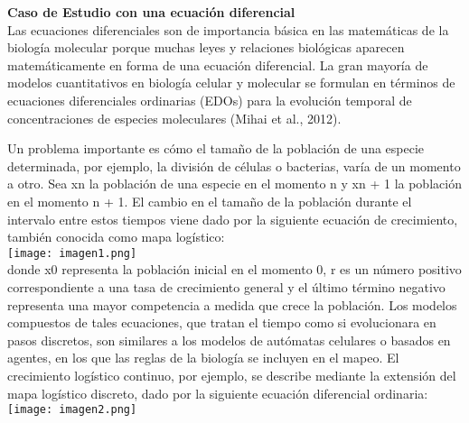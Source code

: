 \documentclass[12pt,a4paper]{article}
\begin{document}
    \textbf{Caso de Estudio con una ecuación diferencial}\\
    Las ecuaciones diferenciales son de importancia básica en las matemáticas de la biología molecular porque muchas leyes y relaciones biológicas aparecen matemáticamente en forma de una ecuación diferencial.  La gran mayoría de modelos cuantitativos en biología celular y molecular se formulan en términos de ecuaciones diferenciales ordinarias (EDOs) para la evolución temporal de concentraciones de especies moleculares (Mihai et al., 2012).  
    
    Un problema importante es cómo el tamaño de la población de una especie determinada, por ejemplo, la división de células o bacterias, varía de un momento a otro. Sea xn la población de una especie en el momento n y xn + 1 la población en el momento n + 1. El cambio en el tamaño de la población durante el intervalo entre estos tiempos viene dado por la siguiente ecuación de crecimiento, también conocida como mapa logístico:\\
    \texttt{[image: imagen1.png]}\\
    
    donde x0 representa la población inicial en el momento 0, r es un número positivo correspondiente a una tasa de crecimiento general y el último término negativo representa una mayor competencia a medida que crece la población.
     Los modelos compuestos de tales ecuaciones, que tratan el tiempo como si evolucionara en pasos discretos, son similares a los modelos de autómatas celulares o basados en agentes, en los que las reglas de la biología se incluyen en el mapeo. El crecimiento logístico continuo, por ejemplo, se describe mediante la extensión del mapa logístico discreto, dado por la siguiente ecuación diferencial ordinaria:\\
     \texttt{[image: imagen2.png]}\\
    
\end{document}
